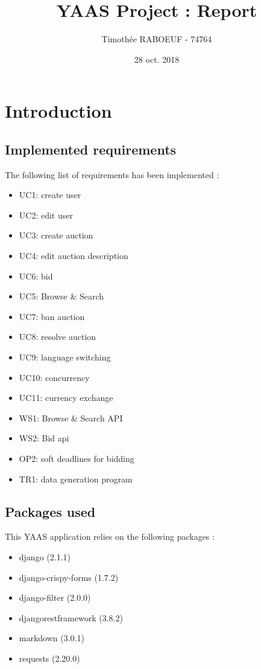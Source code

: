 \documentclass[a4paper, 11pt]{report}
\title{YAAS Project : Report}
\author{Timothée RABOEUF - 74764}
\date{28 oct. 2018}
\begin{document}
 
\maketitle
\tableofcontents
    
\chapter{Introduction}

    \section{Implemented requirements}

    The following list of requirements has been implemented : 
    \begin{itemize}
        \item UC1: create user
        \item UC2: edit user
        \item UC3: create auction
        \item UC4: edit auction description
        \item UC6: bid
        \item UC5: Browse \& Search
        \item UC7: ban auction
        \item UC8: resolve auction
        \item UC9: language switching
        \item UC10: concurrency
        \item UC11: currency exchange
        \item WS1: Browse \& Search API
        \item WS2: Bid api
        \item OP2: soft deadlines for bidding
        \item TR1: data generation program

    \end{itemize}

    \section{Packages used}
    This YAAS application relies on the following packages :
    \begin{itemize}
        \item django (2.1.1)
        \item django-crispy-forms (1.7.2)
        \item django-filter (2.0.0) 
        \item djangorestframework (3.8.2)
        \item markdown (3.0.1)
        \item requests (2.20.0)
        
    \end{itemize}
\end{document}
